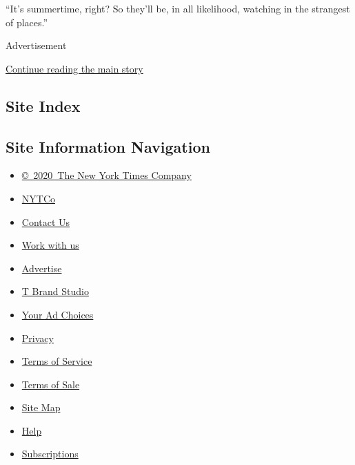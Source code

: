 ``It's summertime, right? So they'll be, in all likelihood, watching in
the strangest of places.''

Advertisement

\protect\hyperlink{after-bottom}{Continue reading the main story}

\hypertarget{site-index}{%
\subsection{Site Index}\label{site-index}}

\hypertarget{site-information-navigation}{%
\subsection{Site Information
Navigation}\label{site-information-navigation}}

\begin{itemize}
\tightlist
\item
  \href{https://help.nytimes3xbfgragh.onion/hc/en-us/articles/115014792127-Copyright-notice}{©~2020~The
  New York Times Company}
\end{itemize}

\begin{itemize}
\tightlist
\item
  \href{https://www.nytco.com/}{NYTCo}
\item
  \href{https://help.nytimes3xbfgragh.onion/hc/en-us/articles/115015385887-Contact-Us}{Contact
  Us}
\item
  \href{https://www.nytco.com/careers/}{Work with us}
\item
  \href{https://nytmediakit.com/}{Advertise}
\item
  \href{http://www.tbrandstudio.com/}{T Brand Studio}
\item
  \href{https://www.nytimes3xbfgragh.onion/privacy/cookie-policy\#how-do-i-manage-trackers}{Your
  Ad Choices}
\item
  \href{https://www.nytimes3xbfgragh.onion/privacy}{Privacy}
\item
  \href{https://help.nytimes3xbfgragh.onion/hc/en-us/articles/115014893428-Terms-of-service}{Terms
  of Service}
\item
  \href{https://help.nytimes3xbfgragh.onion/hc/en-us/articles/115014893968-Terms-of-sale}{Terms
  of Sale}
\item
  \href{https://spiderbites.nytimes3xbfgragh.onion}{Site Map}
\item
  \href{https://help.nytimes3xbfgragh.onion/hc/en-us}{Help}
\item
  \href{https://www.nytimes3xbfgragh.onion/subscription?campaignId=37WXW}{Subscriptions}
\end{itemize}
